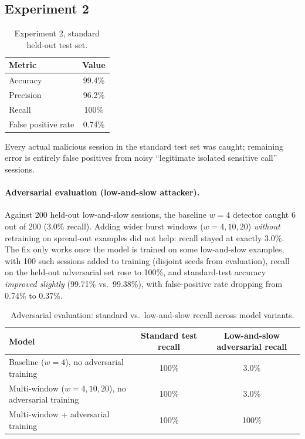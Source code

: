 \documentclass[11pt,a4paper]{article}
\begin{document}
\subsection{Experiment 2}

\begin{table}[h]
\centering
\begin{tabular}{@{}lc@{}}
\toprule
Metric & Value \\
\midrule
Accuracy & 99.4\% \\
Precision & 96.2\% \\
Recall & 100\% \\
False positive rate & 0.74\% \\
\bottomrule
\end{tabular}
\caption{Experiment 2, standard held-out test set.}
\end{table}

Every actual malicious session in the standard test set was caught; remaining error is entirely false positives from noisy ``legitimate isolated sensitive call'' sessions.

\paragraph{Adversarial evaluation (low-and-slow attacker).} Against 200 held-out low-and-slow sessions, the baseline $w{=}4$ detector caught 6 out of 200 (3.0\% recall). Adding wider burst windows ($w=4,10,20$) \emph{without} retraining on spread-out examples did not help: recall stayed at exactly 3.0\%. The fix only works once the model is trained on some low-and-slow examples, with 100 such sessions added to training (disjoint seeds from evaluation), recall on the held-out adversarial set rose to 100\%, and standard-test accuracy \emph{improved slightly} (99.71\% vs.\ 99.38\%), with false-positive rate dropping from 0.74\% to 0.37\%.

\begin{table}[h]
\centering
\begin{tabular}{@{}lcc@{}}
\toprule
Model & Standard test recall & Low-and-slow adversarial recall \\
\midrule
Baseline ($w=4$), no adversarial training & 100\% & 3.0\% \\
Multi-window ($w=4,10,20$), no adversarial training & 100\% & 3.0\% \\
Multi-window + adversarial training & 100\% & 100\% \\
\bottomrule
\end{tabular}
\caption{Adversarial evaluation: standard vs.\ low-and-slow recall across model variants.}
\end{table}
\end{document}
